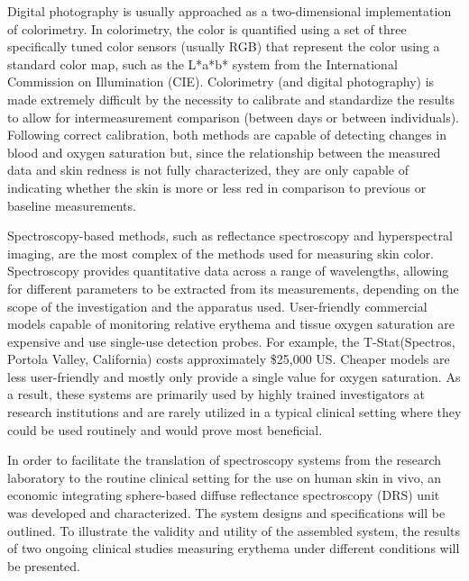 Digital photography is usually approached as a two-dimensional implementation of colorimetry. In colorimetry, the color is quantified using a set of three specifically tuned color sensors (usually RGB) that represent the color using a standard color map, such as the L*a*b* system from the International Commission on Illumination (CIE).\cite{CI2012} Colorimetry (and digital photography) is made extremely difficult by the necessity to calibrate and standardize the results to allow for intermeasurement comparison (between days or between individuals).\cite{Jung2012} Following correct calibration, both methods are capable of detecting changes in blood and oxygen saturation but, since the relationship between the measured data and skin redness is not fully characterized, they are only capable of indicating whether the skin is more or less red in comparison to previous or baseline measurements.\cite{Kollias2002,Canning2009,Nishidate2011,Setaro2002}

Spectroscopy-based methods, such as reflectance spectroscopy and hyperspectral imaging, are the most complex of the methods used for measuring skin color.\cite{Zhang2005,Stamatas2008,Kollias2010,Yudovsky2010,Chin2012} Spectroscopy provides quantitative data across a range of wavelengths, allowing for different parameters to be extracted from its measurements, depending on the scope of the investigation and the apparatus used. User-friendly commercial models capable of monitoring relative erythema and tissue oxygen saturation are expensive and use single-use detection probes. For example, the T-Stat\textregistered (Spectros, Portola Valley, California) costs approximately \$25,000 US.\cite{Fox2012} Cheaper models are less user-friendly and mostly only provide a single value for oxygen saturation. As a result, these systems are primarily used by highly trained investigators at research institutions and are rarely utilized in a typical clinical setting where they could be used routinely and would prove most beneficial.

In order to facilitate the translation of spectroscopy systems from the research laboratory to the routine clinical setting for the use on human skin in vivo, an economic integrating sphere-based diffuse reflectance spectroscopy (DRS) unit was developed and characterized. The system designs and specifications will be outlined. To illustrate the validity and utility of the assembled system, the results of two ongoing clinical studies measuring erythema under different conditions will be presented.

